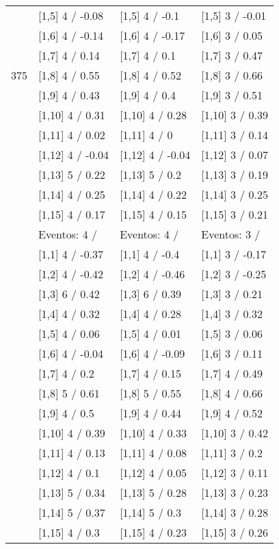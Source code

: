 \begin{table}
\begin{tabular}[t]{llll}
 & {}[1,5] 4  / -0.08 & {}[1,5] 4  / -0.1 & {}[1,5] 3  / -0.01\\
 & {}[1,6] 4  / -0.14 & {}[1,6] 4  / -0.17 & {}[1,6] 3  / 0.05\\
 & {}[1,7] 4  / 0.14 & {}[1,7] 4  / 0.1 & {}[1,7] 3  / 0.47\\
375 & {}[1,8] 4  / 0.55 & {}[1,8] 4  / 0.52 & {}[1,8] 3  / 0.66\\
\addlinespace
 & {}[1,9] 4  / 0.43 & {}[1,9] 4  / 0.4 & {}[1,9] 3  / 0.51\\
 & {}[1,10] 4  / 0.31 & {}[1,10] 4  / 0.28 & {}[1,10] 3  / 0.39\\
 & {}[1,11] 4  / 0.02 & {}[1,11] 4  / 0 & {}[1,11] 3  / 0.14\\
 & {}[1,12] 4  / -0.04 & {}[1,12] 4  / -0.04 & {}[1,12] 3  / 0.07\\
 & {}[1,13] 5  / 0.22 & {}[1,13] 5  / 0.2 & {}[1,13] 3  / 0.19\\
\addlinespace
 & {}[1,14] 4  / 0.25 & {}[1,14] 4  / 0.22 & {}[1,14] 3  / 0.25\\
 & {}[1,15] 4  / 0.17 & {}[1,15] 4  / 0.15 & {}[1,15] 3  / 0.21\\
 & Eventos:  4 / & Eventos:  4 / & Eventos:  3 /\\
 & {}[1,1] 4  / -0.37 & {}[1,1] 4  / -0.4 & {}[1,1] 3  / -0.17\\
 & {}[1,2] 4  / -0.42 & {}[1,2] 4  / -0.46 & {}[1,2] 3  / -0.25\\
\addlinespace
 & {}[1,3] 6  / 0.42 & {}[1,3] 6  / 0.39 & {}[1,3] 3  / 0.21\\
 & {}[1,4] 4  / 0.32 & {}[1,4] 4  / 0.28 & {}[1,4] 3  / 0.32\\
 & {}[1,5] 4  / 0.06 & {}[1,5] 4  / 0.01 & {}[1,5] 3  / 0.06\\
 & {}[1,6] 4  / -0.04 & {}[1,6] 4  / -0.09 & {}[1,6] 3  / 0.11\\
 & {}[1,7] 4  / 0.2 & {}[1,7] 4  / 0.15 & {}[1,7] 4  / 0.49\\
\addlinespace
500 & {}[1,8] 5  / 0.61 & {}[1,8] 5  / 0.55 & {}[1,8] 4  / 0.66\\
 & {}[1,9] 4  / 0.5 & {}[1,9] 4  / 0.44 & {}[1,9] 4  / 0.52\\
 & {}[1,10] 4  / 0.39 & {}[1,10] 4  / 0.33 & {}[1,10] 3  / 0.42\\
 & {}[1,11] 4  / 0.13 & {}[1,11] 4  / 0.08 & {}[1,11] 3  / 0.2\\
 & {}[1,12] 4  / 0.1 & {}[1,12] 4  / 0.05 & {}[1,12] 3  / 0.11\\
\addlinespace
 & {}[1,13] 5  / 0.34 & {}[1,13] 5  / 0.28 & {}[1,13] 3  / 0.23\\
 & {}[1,14] 5  / 0.37 & {}[1,14] 5  / 0.3 & {}[1,14] 3  / 0.28\\
 & {}[1,15] 4  / 0.3 & {}[1,15] 4  / 0.23 & {}[1,15] 3  / 0.26\\
\bottomrule
\end{tabular}
\end{table}
